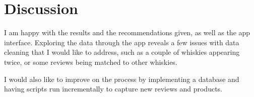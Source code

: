 \documentclass{article}
\begin{document}
\newpage
\section{Discussion}
I am happy with the results and the recommendations given, as well as the app interface. Exploring the data through the app reveals a few issues with data cleaning that I would like to address, such as a couple of whiskies appearing twice, or some reviews being matched to other whiskies.

I would also like to improve on the process by implementing a database and having scripts run incrementally to capture new reviews and products.

\newpage

\listoffigures
\end{document}
